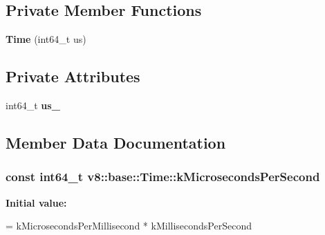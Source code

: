 \subsection*{Private Member Functions}
\begin{DoxyCompactItemize}
\item 
{\bfseries Time} (int64\+\_\+t us)\hypertarget{classv8_1_1base_1_1_time_ada2ee29e6e163a01dec98477f9de9d7e}{}\label{classv8_1_1base_1_1_time_ada2ee29e6e163a01dec98477f9de9d7e}

\end{DoxyCompactItemize}
\subsection*{Private Attributes}
\begin{DoxyCompactItemize}
\item 
int64\+\_\+t {\bfseries us\+\_\+}\hypertarget{classv8_1_1base_1_1_time_a4ac8c365c91f0ec9cdf3e9f36d2cc1a5}{}\label{classv8_1_1base_1_1_time_a4ac8c365c91f0ec9cdf3e9f36d2cc1a5}

\end{DoxyCompactItemize}


\subsection{Member Data Documentation}
\subsubsection[{\texorpdfstring{k\+Microseconds\+Per\+Second}{kMicrosecondsPerSecond}}]{\setlength{\rightskip}{0pt plus 5cm}const int64\+\_\+t v8\+::base\+::\+Time\+::k\+Microseconds\+Per\+Second\hspace{0.3cm}{\ttfamily [static]}}\hypertarget{classv8_1_1base_1_1_time_a2edd6d47a6bc35479d0a8e908fe34e0d}{}\label{classv8_1_1base_1_1_time_a2edd6d47a6bc35479d0a8e908fe34e0d}
{\bfseries Initial value\+:}
\begin{DoxyCode}
= kMicrosecondsPerMillisecond *
                                                kMillisecondsPerSecond
\end{DoxyCode}
